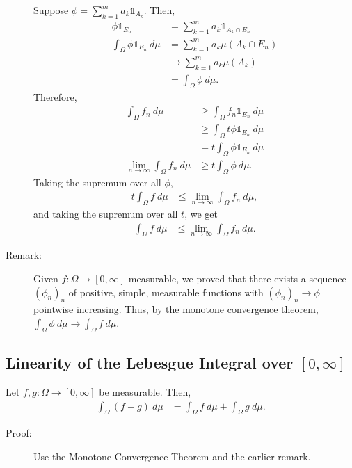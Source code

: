 \documentclass[9pt]{extarticle}
\begin{document}
\begin{description}
      Suppose $\phi = \sum_{k=1}^{m}a_k\mathbb{1}_{A_k}$. Then,
      \begin{align*}
        \phi\mathbb{1}_{E_n} &= \sum_{k=1}^{m}a_k\mathbb{1}_{A_k\cap E_n}\\
        \int_{\Omega}\phi\mathbb{1}_{E_n}~d\mu &= \sum_{k=1}^{m}a_k\mu(A_k\cap E_n)\\
                                               &\rightarrow \sum_{k=1}^{m} a_k\mu(A_k)\\
                                               &= \int_{\Omega}\phi~d\mu.
      \end{align*}
      Therefore,
      \begin{align*}
        \int_{\Omega}f_n~d\mu &\geq \int_{\Omega}f_n\mathbb{1}_{E_n}~d\mu\\
                              &\geq \int_{\Omega}t\phi\mathbb{1}_{E_n}~d\mu\\
                              &= t\int_{\Omega}\phi\mathbb{1}_{E_n}~d\mu\\
        \lim_{n\rightarrow\infty}\int_{\Omega}f_n~d\mu &\geq t\int_{\Omega}\phi~d\mu.
      \end{align*}
      Taking the supremum over all $\phi$,
      \begin{align*}
        t\int_{\Omega}f~d\mu &\leq \lim_{n\rightarrow\infty}\int_{\Omega}f_n~d\mu,
      \end{align*}
      and taking the supremum over all $t$, we get
      \begin{align*}
        \int_{\Omega}f~d\mu &\leq \lim_{n\rightarrow\infty}\int_{\Omega}f_n~d\mu.
      \end{align*}
    \item[Remark:] Given $f: \Omega \rightarrow [0,\infty]$ measurable, we proved that there exists a sequence $(\phi_n)_n$ of positive, simple, measurable functions with $(\phi_n)_n\rightarrow \phi$ pointwise increasing. Thus, by the monotone convergence theorem, $\int_{\Omega}\phi~d\mu \rightarrow \int_{\Omega}f~d\mu$.
  \end{description}
  \subsection{Linearity of the Lebesgue Integral over $[0,\infty]$}%
  Let $f,g: \Omega \rightarrow [0,\infty]$ be measurable. Then,
  \begin{align*}
    \int_{\Omega}(f+g)~d\mu &= \int_{\Omega}f~d\mu + \int_{\Omega}g~d\mu.
  \end{align*}
  \begin{description}
    \item[Proof:] Use the Monotone Convergence Theorem and the earlier remark.
  \end{description}
\end{document}

